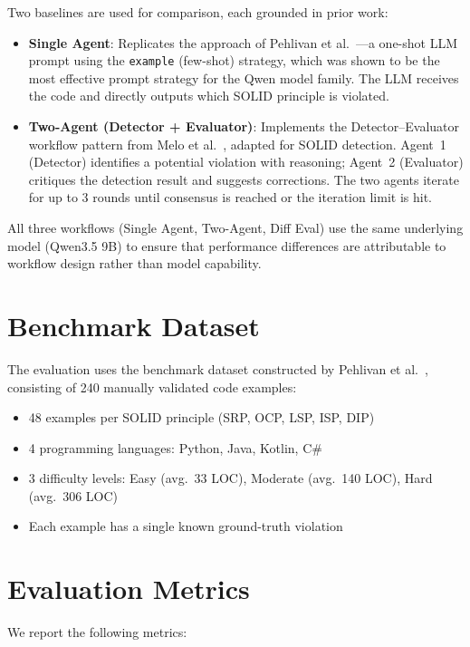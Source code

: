 \documentclass[12pt,a4paper,oneside]{report}
\begin{document}
Two baselines are used for comparison, each grounded in prior work:

\begin{itemize}
  \item \textbf{Single Agent}: Replicates the approach of Pehlivan et al.~\cite{Pehlivan2025}---a one-shot LLM prompt using the \texttt{example} (few-shot) strategy, which was shown to be the most effective prompt strategy for the Qwen model family. The LLM receives the code and directly outputs which SOLID principle is violated.
  \item \textbf{Two-Agent (Detector + Evaluator)}: Implements the Detector--Evaluator workflow pattern from Melo et al.~\cite{Melo2025}, adapted for SOLID detection. Agent~1 (Detector) identifies a potential violation with reasoning; Agent~2 (Evaluator) critiques the detection result and suggests corrections. The two agents iterate for up to 3 rounds until consensus is reached or the iteration limit is hit.
\end{itemize}

All three workflows (Single Agent, Two-Agent, Diff Eval) use the same underlying model (Qwen3.5 9B) to ensure that performance differences are attributable to workflow design rather than model capability.

\section{Benchmark Dataset}

The evaluation uses the benchmark dataset constructed by Pehlivan et al.~\cite{Pehlivan2025}, consisting of 240 manually validated code examples:
\begin{itemize}
  \item 48 examples per SOLID principle (SRP, OCP, LSP, ISP, DIP)
  \item 4 programming languages: Python, Java, Kotlin, C\#
  \item 3 difficulty levels: Easy (avg.\ 33 LOC), Moderate (avg.\ 140 LOC), Hard (avg.\ 306 LOC)
  \item Each example has a single known ground-truth violation
\end{itemize}

\section{Evaluation Metrics}
\label{sec:metrics}

We report the following metrics:
\end{document}
